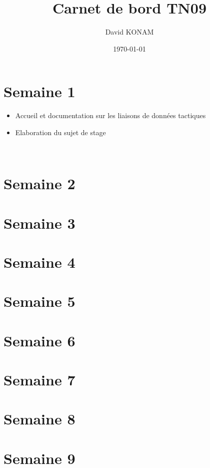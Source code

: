 \documentclass[a4paper]{article}
\title{Carnet de bord TN09}
\author{David KONAM}
\date{\today}
\begin{document}
\maketitle
\newpage
\tableofcontents
\newpage
\section{Semaine 1}
\begin{itemize}
\item Accueil  et  documentation  sur  les  liaisons  de  données  tactiques
\item Elaboration  du  sujet  de  stage
\end{itemize}
~\\
\section{Semaine 2}
\section{Semaine 3}
\section{Semaine 4}
\section{Semaine 5}
\section{Semaine 6}
\section{Semaine 7}
\section{Semaine 8}
\section{Semaine 9}
\end{document}
